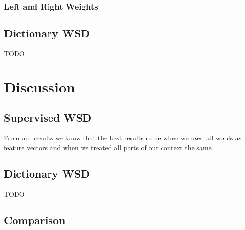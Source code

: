 \documentclass[11pt]{article}
\begin{document}
\subsubsection{Left and Right Weights}
	
\subsection{Dictionary WSD}
TODO

\section{Discussion}
\subsection{Supervised WSD}
From our results we know that the best results came when we used all words as feature vectors and when we treated all parts of our context the same. 

\subsection{Dictionary WSD}
TODO

\subsection{Comparison}
\end{document}
